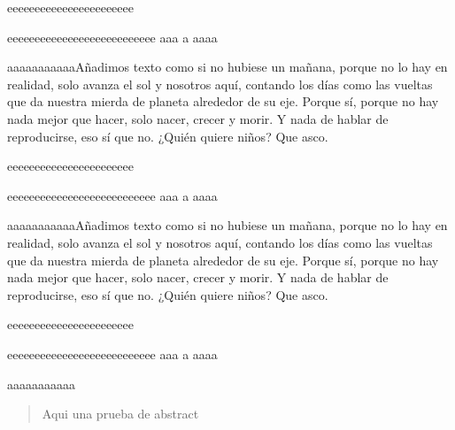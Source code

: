 \documentclass[]{article}
\begin{document}
eeeeeeeeeeeeeeeeeeeeeee

eeeeeeeeeeeeeeeeeeeeeeeeeee
aaa
a
aaaa

aaaaaaaaaaaAñadimos texto como si no hubiese un mañana, porque no lo hay en realidad, solo avanza el sol y nosotros aquí, contando los días como las vueltas que da nuestra mierda de planeta alrededor de su eje.
Porque sí, porque no hay nada mejor que hacer, solo nacer, crecer y morir. Y nada de hablar de reproducirse, eso sí que no. ¿Quién quiere niños? Que asco.

eeeeeeeeeeeeeeeeeeeeeee

eeeeeeeeeeeeeeeeeeeeeeeeeee
aaa
a
aaaa

aaaaaaaaaaaAñadimos texto como si no hubiese un mañana, porque no lo hay en realidad, solo avanza el sol y nosotros aquí, contando los días como las vueltas que da nuestra mierda de planeta alrededor de su eje.
Porque sí, porque no hay nada mejor que hacer, solo nacer, crecer y morir. Y nada de hablar de reproducirse, eso sí que no. ¿Quién quiere niños? Que asco.

eeeeeeeeeeeeeeeeeeeeeee

eeeeeeeeeeeeeeeeeeeeeeeeeee
aaa
a
aaaa

aaaaaaaaaaa
\begin{abstract}

Aqui una prueba de abstract

\end{abstract}

\section{}
\end{document}
